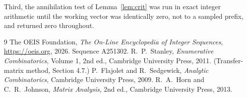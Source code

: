 \documentclass[11pt,a4paper]{article}
\theoremstyle{plain}
\theoremstyle{definition}
\begin{document}
Third, the annihilation test of Lemma~\ref{lem:crit} was run in exact integer arithmetic
until the working vector was identically zero, not to a sampled prefix, and returned zero
throughout.

\begin{thebibliography}{9}
 The OEIS Foundation, \emph{The On-Line Encyclopedia of Integer
Sequences}, \url{https://oeis.org}, 2026. Sequence A251302.
 R.~P.~Stanley, \emph{Enumerative Combinatorics}, Volume 1, 2nd ed.,
Cambridge University Press, 2011. (Transfer-matrix method, Section 4.7.)
 P.~Flajolet and R.~Sedgewick, \emph{Analytic Combinatorics}, Cambridge
University Press, 2009.
 R.~A.~Horn and C.~R.~Johnson, \emph{Matrix Analysis}, 2nd ed., Cambridge
University Press, 2013.
\end{thebibliography}
\end{document}
